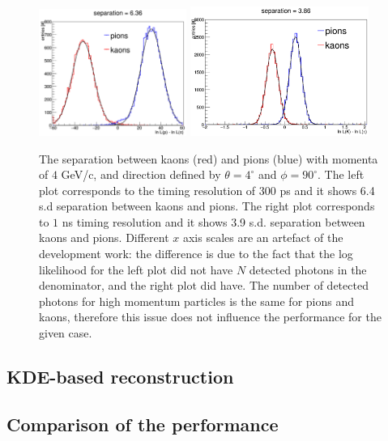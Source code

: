 \documentclass[11pt, a4paper]{article}
\begin{document}
\begin{figure}[!h]
\centering
\includegraphics[width=0.43\textwidth]{pics/sepTI300.png} \hspace{0.5cm} \includegraphics[width=0.52\textwidth]{pics/sepTI1000.png}
\caption{\label{pic:sepTI2}
The separation between kaons (red) and pions (blue) with momenta of $4$ GeV/c, and direction defined by $\theta = 4^{\circ}$ and $\phi = 90^{\circ}$. The left plot corresponds to the timing resolution of $300$ ps and it shows 6.4 s.d separation between kaons and pions. The right plot corresponds to $1$ ns timing resolution and it shows 3.9 s.d. separation between kaons and pions. \newline \footnotesize{Different $x$ axis scales are an artefact of the development work: the difference is due to the fact that the log likelihood for the left plot did not have $N$ detected photons in the denominator, and the right plot did have. The number of detected photons for high momentum particles is the same for pions and kaons, therefore this issue does not influence the performance for the given case. }
}
\end{figure}

\subsection{KDE-based reconstruction}

\subsection{Comparison of the performance}
 
\end{document}
